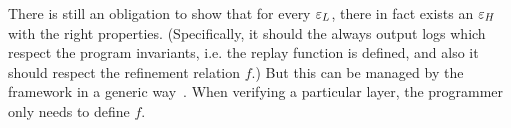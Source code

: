 There is still an obligation to show that for every ${\varepsilon}_L$, there
in fact exists an ${\varepsilon}_H$ with the right
properties. (Specifically, it should the always output logs which
respect the program invariants, i.e. the replay function is defined,
and also it should respect the refinement relation $f$.) But this can
be managed by the framework in a generic way~\cite{concurrency}. When
verifying a particular layer, the programmer only needs to define $f$.

